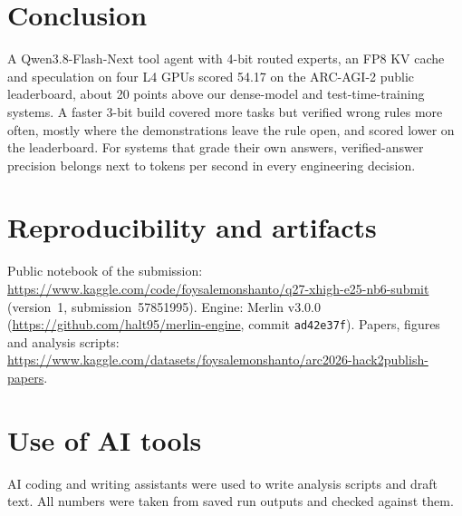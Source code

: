 \documentclass[11pt]{article}
\begin{document}
\section{Conclusion}
A Qwen3.8-Flash-Next tool agent with 4-bit routed experts, an FP8 KV cache and speculation on four L4 GPUs scored 54.17 on the ARC-AGI-2 public leaderboard, about 20 points above our dense-model and test-time-training systems. A faster 3-bit build covered more tasks but verified wrong rules more often, mostly where the demonstrations leave the rule open, and scored lower on the leaderboard. For systems that grade their own answers, verified-answer precision belongs next to tokens per second in every engineering decision.

\section*{Reproducibility and artifacts}
Public notebook of the submission: \url{https://www.kaggle.com/code/foysalemonshanto/q27-xhigh-e25-nb6-submit} (version~1, submission~57851995). Engine: Merlin v3.0.0 (\url{https://github.com/halt95/merlin-engine}, commit \texttt{ad42e37f}). Papers, figures and analysis scripts: \url{https://www.kaggle.com/datasets/foysalemonshanto/arc2026-hack2publish-papers}.

\section*{Use of AI tools}
AI coding and writing assistants were used to write analysis scripts and draft text. All numbers were taken from saved run outputs and checked against them.




\appendix

\end{document}
